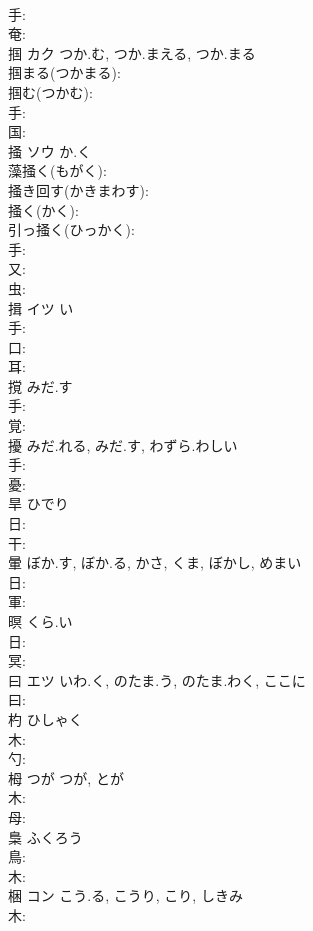 \documentclass[8pt]{extreport}
\begin{document}
\begin{CJK}{UTF8}{min}
\\	手: 
\\	奄: 
\\	掴	カク	つか.む, つか.まえる, つか.まる		
\\	掴まる(つかまる): 
\\	掴む(つかむ): 
\\	手: 
\\	国: 
\\	掻	ソウ	か.く		
\\	藻掻く(もがく): 
\\	掻き回す(かきまわす): 
\\	掻く(かく): 
\\	引っ掻く(ひっかく): 
\\	手: 
\\	又: 
\\	虫: 
\\	揖	イツ		い	
\\	手: 
\\	口: 
\\	耳: 
\\	撹		みだ.す			
\\	手: 
\\	覚: 
\\	擾		みだ.れる, みだ.す, わずら.わしい			
\\	手: 
\\	憂: 
\\	旱		ひでり			
\\	日: 
\\	干: 
\\	暈		ぼか.す, ぼか.る, かさ, くま, ぼかし, めまい			
\\	日: 
\\	軍: 
\\	暝		くら.い			
\\	日: 
\\	冥: 
\\	曰	エツ	いわ.く, のたま.う, のたま.わく, ここに		
\\	曰: 
\\	杓		ひしゃく			
\\	木: 
\\	勺: 
\\	栂	つが	つが, とが		
\\	木: 
\\	母: 
\\	梟		ふくろう			
\\	鳥: 
\\	木: 
\\	梱	コン	こう.る, こうり, こり, しきみ		
\\	木: 

\end{CJK}
\end{document}
